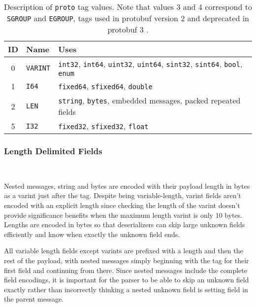 \documentclass[11pt]{article}
\theoremstyle{definition}
\theoremstyle{plain}
\begin{document}
\begin{table}[H]
	\centering
	\begin{tabular}{cll}
		\toprule
		ID & Name            & Uses                                                 \\
		\midrule
		0  & \texttt{VARINT} & \texttt{int32}, \texttt{int64}, \texttt{uint32},
		\texttt{uint64}, \texttt{sint32}, \texttt{sint64},
		\texttt{bool}, \texttt{enum}                                                \\
		1  & \texttt{I64}    & \texttt{fixed64}, \texttt{sfixed64}, \texttt{double} \\
		2  & \texttt{LEN}    & \texttt{string}, \texttt{bytes}, embedded messages,
		packed repeated fields                                                      \\
		5  & \texttt{I32}    & \texttt{fixed32}, \texttt{sfixed32},
		\texttt{float}                                                              \\
		\bottomrule
	\end{tabular}

	\vspace{4mm}
	\caption[]{Description of \texttt{proto} tag values. Note that values 3 and
		4 correspond to \texttt{SGROUP} and \texttt{EGROUP}, tags used in protobuf
		version 2 and deprecated in protobuf 3 \autocite{Encoding}.}\label{tab:tags}
\end{table}

\subsubsection{Length Delimited Fields}~\label{sec:proto-len}

Nested messages, string and bytes are encoded with their payload length in bytes
as a varint just after the tag. Despite being variable-length, varint fields
aren't encoded with an explicit length since checking the length of the varint
doesn't provide significance benefits when the maximum length varint is only 10
bytes. Lengths are encoded in bytes so that deserializers can skip large unknown
fields efficiently and know when exactly the unknown field ends.

All variable length fields except varints are prefixed with a length and then
the rest of the payload, with nested messages simply beginning with the tag for
their first field and continuing from there. Since nested messages include the
complete field encodings, it is important for the parser to be able to skip an
unknown field exactly rather than incorrectly thinking a nested unknown field is
setting field in the parent message.
\end{document}
